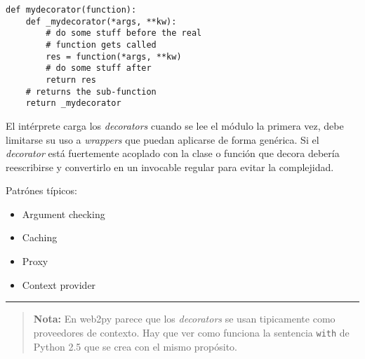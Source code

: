 \documentclass[12pt,spanish,]{article}
\providecommand{\tightlist}{%
  \setlength{\itemsep}{0pt}\setlength{\parskip}{0pt}}
\begin{document}
\begin{verbatim}
def mydecorator(function):
    def _mydecorator(*args, **kw):
        # do some stuff before the real 
        # function gets called 
        res = function(*args, **kw)
        # do some stuff after
        return res
    # returns the sub-function
    return _mydecorator
\end{verbatim}

El intérprete carga los \emph{decorators} cuando se lee el módulo la
primera vez, debe limitarse su uso a \emph{wrappers} que puedan
aplicarse de forma genérica. Si el \emph{decorator} está fuertemente
acoplado con la clase o función que decora debería reescribirse y
convertirlo en un invocable regular para evitar la complejidad.

Patrónes típicos:

\begin{itemize}
\tightlist
\item
  Argument checking
\item
  Caching
\item
  Proxy
\item
  Context provider
\end{itemize}

\begin{center}\rule{0.5\linewidth}{\linethickness}\end{center}

\begin{quote}
\textbf{Nota:} En web2py parece que los \emph{decorators} se usan
tipicamente como proveedores de contexto. Hay que ver como funciona la
sentencia \texttt{with} de Python 2.5 que se crea con el mismo
propósito.
\end{quote}
\end{document}
